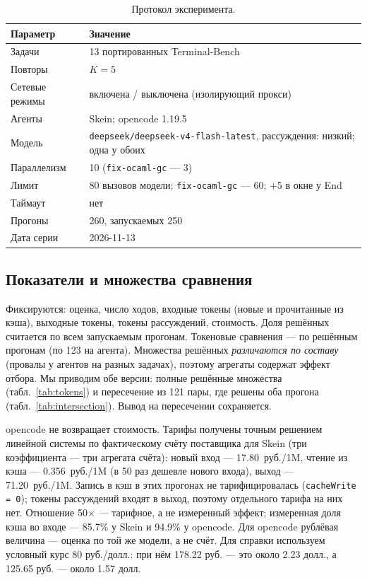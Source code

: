 \documentclass[11pt,a4paper]{article}
\begin{document}
\begin{table}[t]
\centering
\small
\caption{Протокол эксперимента.}
\label{tab:protocol}
\begin{tabular}{@{}ll@{}}
\toprule
Параметр & Значение \\
\midrule
Задачи & 13 портированных Terminal-Bench \\
Повторы & $K=5$ \\
Сетевые режимы & включена / выключена (изолирующий прокси) \\
Агенты & Skein; opencode 1.19.5 \\
Модель & \texttt{deepseek/deepseek-v4-flash-latest}, рассуждения: низкий; одна у обоих \\
Параллелизм & 10 (\texttt{fix-ocaml-gc} --- 3) \\
Лимит & 80 вызовов модели; \texttt{fix-ocaml-gc} --- 60; +5 в окне у End \\
Таймаут & нет \\
Прогоны & 260, запускаемых 250 \\
Дата серии & 2026-11-13 \\
\bottomrule
\end{tabular}
\end{table}

\subsection{Показатели и множества сравнения}

Фиксируются: оценка, число ходов, входные токены (новые и прочитанные из кэша), выходные
токены, токены рассуждений, стоимость. Доля решённых считается по всем запускаемым
прогонам. Токеновые сравнения --- по решённым прогонам (по 123 на агента). Множества решённых
\emph{различаются по составу} (провалы у агентов на разных задачах), поэтому агрегаты
содержат эффект отбора. Мы приводим обе версии: полные решённые множества
(табл.~\ref{tab:tokens}) и пересечение из 121 пары, где решены оба прогона
(табл.~\ref{tab:intersection}). Вывод на пересечении сохраняется.

opencode не возвращает стоимость. Тарифы получены точным решением линейной системы по
фактическому счёту поставщика для Skein (три коэффициента --- три агрегата счёта):
новый вход --- 17.80~руб./1M, чтение из кэша --- 0.356~руб./1M (в 50 раз дешевле нового
входа), выход --- 71.20~руб./1M. Запись в кэш в этих прогонах не тарифицировалась
(\texttt{cacheWrite = 0}); токены рассуждений входят в выход, поэтому отдельного тарифа на
них нет. Отношение 50$\times$ --- тарифное, а не измеренный эффект; измеренная доля кэша
во входе --- 85.7\% у Skein и 94.9\% у opencode. Для opencode рублёвая величина --- оценка
по той же модели, а не счёт. Для справки используем условный курс 80 руб./долл.: при нём
178.22 руб. --- это около 2.23 долл., а 125.65 руб. --- около 1.57 долл.
\end{document}
